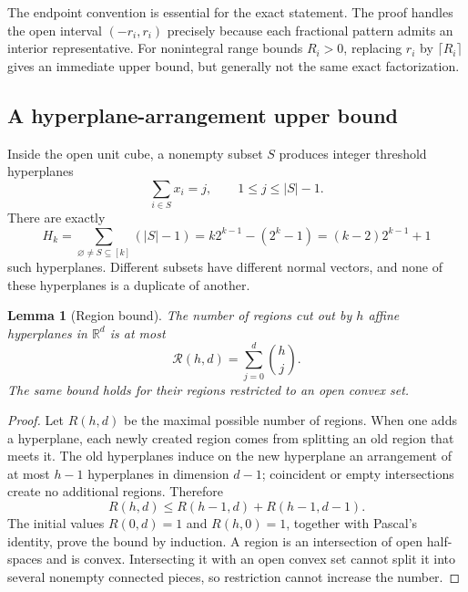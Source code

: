 \documentclass[11pt,letterpaper]{article}
\numberwithin{equation}{section}
\newtheorem{lemma}[theorem]{Lemma}
\theoremstyle{definition}
\theoremstyle{remark}
\newcommand{\R}{\mathbb R}
\newcommand{\1}{\mathbf 1}
\newcommand{\RR}[2]{\mathcal R(#1,#2)}
\begin{document}
The endpoint convention is essential for the exact statement. The proof
handles the open interval $(-r_i,r_i)$ precisely because each fractional
pattern admits an interior representative. For nonintegral range bounds
$R_i>0$, replacing $r_i$ by $\lceil R_i\rceil$ gives an immediate upper
bound, but generally not the same exact factorization.

\subsection{A hyperplane-arrangement upper bound}
Inside the open unit cube, a nonempty subset $S$ produces integer
threshold hyperplanes
\[
 \sum_{i\in S}x_i=j,\qquad 1\le j\le |S|-1.
\]
There are exactly
\begin{equation}\label{gsr:fp:01:eq:H}
 H_k=\sum_{\varnothing\ne S\subseteq[k]}(|S|-1)
    =k2^{k-1}-(2^k-1)=(k-2)2^{k-1}+1
\end{equation}
such hyperplanes. Different subsets have different normal vectors, and
none of these hyperplanes is a duplicate of another.

\begin{lemma}[Region bound]\label{gsr:fp:01:lem:regions}
The number of regions cut out by $h$ affine hyperplanes in $\R^d$ is at
most
\[
 \RR{h}{d}=\sum_{j=0}^d\binom hj.
\]
The same bound holds for their regions restricted to an open convex set.
\end{lemma}
\begin{proof}
Let $R(h,d)$ be the maximal possible number of regions. When one adds a
hyperplane, each newly created region comes from splitting an old region
that meets it. The old hyperplanes induce on the new hyperplane an
arrangement of at most $h-1$ hyperplanes in dimension $d-1$; coincident
or empty intersections create no additional regions. Therefore
\[
 R(h,d)\le R(h-1,d)+R(h-1,d-1).
\]
The initial values $R(0,d)=1$ and $R(h,0)=1$, together with Pascal's
identity, prove the bound by induction. A region is an intersection of
open half-spaces and is convex. Intersecting it with an open convex set
cannot split it into several nonempty connected pieces, so restriction
cannot increase the number.
\end{proof}
\end{document}
